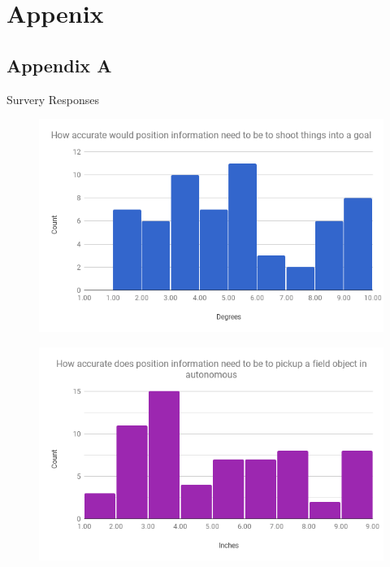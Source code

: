 \documentclass{article}
\begin{document}

\section{Appenix}
\subsection{Appendix A}

  Survery Responses

  \begin{figure}[H]
    \centering
    \includegraphics[width=1\linewidth]{./survey_angle.png}
    \label{fig:survey_angle}
  \end{figure}

  \begin{figure}[H]
    \centering
    \includegraphics[width=1\linewidth]{./survey_position.png}
    \label{fig:survey_position}
  \end{figure}
\end{document}
